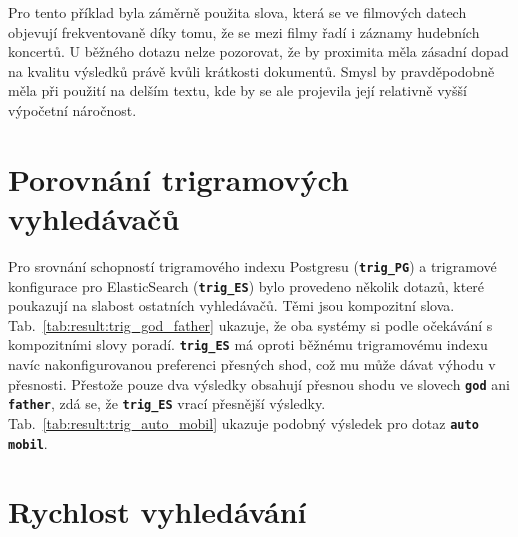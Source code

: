 \documentclass[11pt,letterpaper,oneside,openright]{book}
\newcommand{\bftt}[1]{\texttt{\textbf{#1}}}
\begin{document}
Pro tento příklad byla záměrně použita slova, která se ve filmových datech
objevují frekventovaně díky tomu, že se mezi filmy řadí i záznamy hudebních
koncertů. U běžného dotazu nelze pozorovat, že by proximita měla zásadní dopad
na kvalitu výsledků právě kvůli krátkosti dokumentů. Smysl by pravděpodobně
měla při použití na delším textu, kde by se ale projevila její relativně vyšší
výpočetní náročnost.


\mbox{}\mbox{}

\mbox{}\mbox{}


\section{Porovnání trigramových vyhledávačů}
Pro srovnání schopností trigramového indexu Postgresu (\bftt{trig\_PG}) a
trigramové konfigurace pro ElasticSearch (\bftt{trig\_ES}) bylo provedeno
několik dotazů, které poukazují na slabost ostatních vyhledávačů. Těmi jsou
kompozitní slova. Tab.~\ref{tab:result:trig_god_father} ukazuje, že oba systémy
si podle očekávání s kompozitními slovy poradí. \bftt{trig\_ES} má oproti
běžnému trigramovému indexu navíc nakonfigurovanou preferenci přesných shod,
což mu může dávat výhodu v přesnosti. Přestože pouze dva výsledky obsahují
přesnou shodu ve slovech \bftt{god} ani \bftt{father}, zdá se, že
\bftt{trig\_ES} vrací přesnější výsledky. Tab.~\ref{tab:result:trig_auto_mobil} ukazuje podobný výsledek pro dotaz \bftt{auto mobil}.

\mbox{}\mbox{}

\mbox{}\mbox{}



\clearpage
\section{Rychlost vyhledávání} \label{sec:rychlost_vyhledavani}

\end{document}

